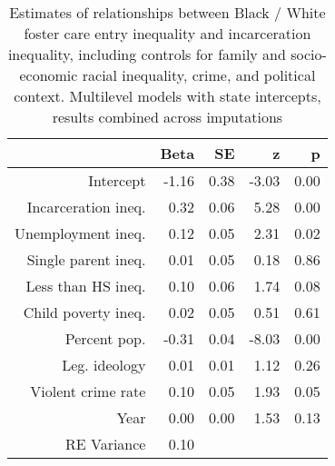 \begin{table}[ht]
\centering
\caption{Estimates of relationships between Black / White foster care entry inequality and incarceration inequality, including controls for family and socio-economic racial inequality, crime, and political context. Multilevel models with state intercepts, results combined across imputations} 
\begin{tabular}{rrrrr}
  \hline
 & Beta & SE & z & p \\ 
  \hline
Intercept & -1.16 & 0.38 & -3.03 & 0.00 \\ 
  Incarceration ineq. & 0.32 & 0.06 & 5.28 & 0.00 \\ 
  Unemployment ineq. & 0.12 & 0.05 & 2.31 & 0.02 \\ 
  Single parent ineq. & 0.01 & 0.05 & 0.18 & 0.86 \\ 
  Less than HS ineq. & 0.10 & 0.06 & 1.74 & 0.08 \\ 
  Child poverty ineq. & 0.02 & 0.05 & 0.51 & 0.61 \\ 
  Percent pop. & -0.31 & 0.04 & -8.03 & 0.00 \\ 
  Leg. ideology & 0.01 & 0.01 & 1.12 & 0.26 \\ 
  Violent crime rate & 0.10 & 0.05 & 1.93 & 0.05 \\ 
  Year & 0.00 & 0.00 & 1.53 & 0.13 \\ 
  RE Variance & 0.10 &  &  &  \\ 
   \hline
\end{tabular}
\end{table}
